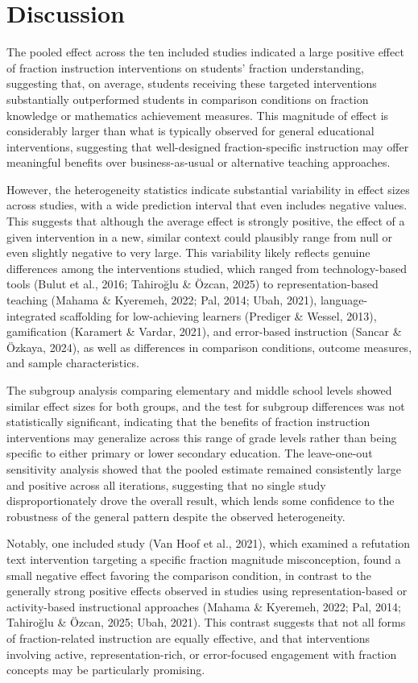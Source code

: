 \documentclass[man,a4paper,12pt,floatsintext,nolmodern,notab]{apa7}
\begin{document}
\section{Discussion}
The pooled effect across the ten included studies indicated a large positive effect of fraction instruction interventions on students' fraction understanding, suggesting that, on average, students receiving these targeted interventions substantially outperformed students in comparison conditions on fraction knowledge or mathematics achievement measures. This magnitude of effect is considerably larger than what is typically observed for general educational interventions, suggesting that well-designed fraction-specific instruction may offer meaningful benefits over business-as-usual or alternative teaching approaches.

However, the heterogeneity statistics indicate substantial variability in effect sizes across studies, with a wide prediction interval that even includes negative values. This suggests that although the average effect is strongly positive, the effect of a given intervention in a new, similar context could plausibly range from null or even slightly negative to very large. This variability likely reflects genuine differences among the interventions studied, which ranged from technology-based tools (Bulut et al., 2016; Tahiroğlu \& Özcan, 2025) to representation-based teaching (Mahama \& Kyeremeh, 2022; Pal, 2014; Ubah, 2021), language-integrated scaffolding for low-achieving learners (Prediger \& Wessel, 2013), gamification (Karamert \& Vardar, 2021), and error-based instruction (Sancar \& Özkaya, 2024), as well as differences in comparison conditions, outcome measures, and sample characteristics.

The subgroup analysis comparing elementary and middle school levels showed similar effect sizes for both groups, and the test for subgroup differences was not statistically significant, indicating that the benefits of fraction instruction interventions may generalize across this range of grade levels rather than being specific to either primary or lower secondary education. The leave-one-out sensitivity analysis showed that the pooled estimate remained consistently large and positive across all iterations, suggesting that no single study disproportionately drove the overall result, which lends some confidence to the robustness of the general pattern despite the observed heterogeneity.

Notably, one included study (Van Hoof et al., 2021), which examined a refutation text intervention targeting a specific fraction magnitude misconception, found a small negative effect favoring the comparison condition, in contrast to the generally strong positive effects observed in studies using representation-based or activity-based instructional approaches (Mahama \& Kyeremeh, 2022; Pal, 2014; Tahiroğlu \& Özcan, 2025; Ubah, 2021). This contrast suggests that not all forms of fraction-related instruction are equally effective, and that interventions involving active, representation-rich, or error-focused engagement with fraction concepts may be particularly promising.
\end{document}
